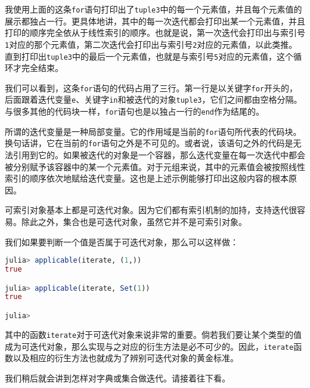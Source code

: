 我使用上面的这条\verb|for|语句打印出了\verb|tuple3|中的每一个元素值，并且每个元素值的展示都独占一行。更具体地讲，其中的每一次迭代都会打印出某一个元素值，并且打印的顺序完全依从于线性索引的顺序。也就是说，第一次迭代会打印出与索引号\verb|1|对应的那个元素值，第二次迭代会打印出与索引号\verb|2|对应的元素值，以此类推。直到打印出\verb|tuple3|中的最后一个元素值，也就是与索引号\verb|5|对应的元素值，这个循环才完全结束。

我们可以看到，这条\verb|for|语句的代码占用了三行。第一行是以关键字\verb|for|开头的，后面跟着迭代变量\verb|e|、关键字\verb|in|和被迭代的对象\verb|tuple3|，它们之间都由空格分隔。与很多其他的代码块一样，\verb|for|语句也是以独占一行的\verb|end|作为结尾的。

所谓的迭代变量是一种局部变量。它的作用域是当前的\verb|for|语句所代表的代码块。换句话讲，它在当前的\verb|for|语句之外是不可见的。或者说，该语句之外的代码是无法引用到它的。如果被迭代的对象是一个容器，那么迭代变量在每一次迭代中都会被分别赋予该容器中的某一个元素值。对于元组来说，其中的元素值会被按照线性索引的顺序依次地赋给迭代变量。这也是上述示例能够打印出这般内容的根本原因。

可索引对象基本上都是可迭代对象。因为它们都有索引机制的加持，支持迭代很容易。除此之外，集合也是可迭代对象，虽然它并不是可索引对象。

我们如果要判断一个值是否属于可迭代对象，那么可以这样做：
\begin{lstlisting}[language=julia]
julia> applicable(iterate, (1,))
true

julia> applicable(iterate, Set(1))
true

julia> 
\end{lstlisting}

其中的函数\verb|iterate|对于可迭代对象来说非常的重要。倘若我们要让某个类型的值成为可迭代对象，那么实现与之对应的衍生方法是必不可少的。因此，\verb|iterate|函数以及相应的衍生方法也就成为了辨别可迭代对象的黄金标准。

我们稍后就会讲到怎样对字典或集合做迭代。请接着往下看。
